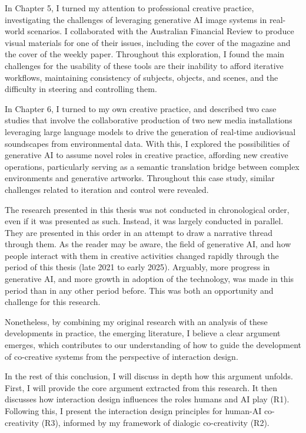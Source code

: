 In Chapter 5, I turned my attention to professional creative practice, investigating the challenges of leveraging generative AI image systems in real-world scenarios. I collaborated with the Australian Financial Review to produce visual materials for one of their issues, including the cover of the magazine and the cover of the weekly paper. Throughout this exploration, I found the main challenges for the usability of these tools are their inability to afford iterative workflows, maintaining consistency of subjects, objects, and scenes, and the difficulty in steering and controlling them.

In Chapter 6, I turned to my own creative practice, and described two case studies that involve the collaborative production of two new media installations leveraging large language models to drive the generation of real-time audiovisual soundscapes from environmental data. With this, I explored the possibilities of generative AI to assume novel roles in creative practice, affording new creative operations, particularly serving as a semantic translation bridge between complex environments and generative artworks. Throughout this case study, similar challenges related to iteration and control were revealed.

The research presented in this thesis was not conducted in chronological order, even if it was presented as such. Instead, it was largely conducted in parallel. They are presented in this order in an attempt to draw a narrative thread through them. As the reader may be aware, the field of generative AI, and how people interact with them in creative activities changed rapidly through the period of this thesis (late 2021 to early 2025). Arguably, more progress in generative AI, and more growth in adoption of the technology, was made in this period than in any other period before. This was both an opportunity and challenge for this research.

Nonetheless, by combining my original research with an analysis of these developments in practice, the emerging literature, I believe a clear argument emerges, which contributes to our understanding of how to guide the development of co-creative systems from the perspective of interaction design.

In the rest of this conclusion, I will discuss in depth how this argument unfolds. First, I will provide the core argument extracted from this research. It then discusses how interaction design influences the roles humans and AI play (R1). Following this, I present the interaction design principles for human-AI co-creativity (R3), informed by my framework of dialogic co-creativity (R2).


